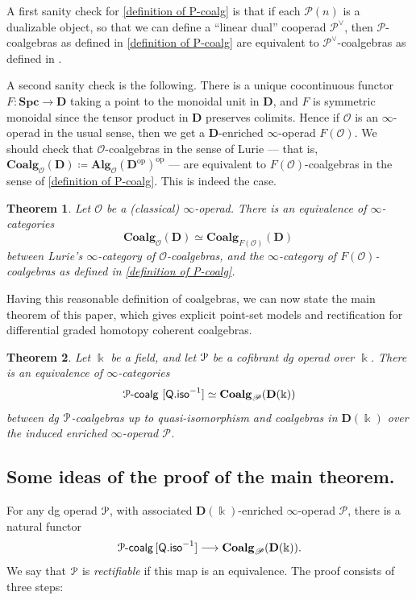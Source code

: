 \documentclass{proc-l}
\renewcommand{\mathcal}{\EuScript}
\newtheorem{theoremintro}{Theorem}
\newcommand{\onepcoalg}{\mathcal{P}\text{-}\mathsf{coalg}}
\theoremstyle{plain}
\theoremstyle{definition}
\theoremstyle{remark}
\newcommand{\kk}{\Bbbk}
\begin{document}
A first sanity check for \cref{definition of P-coalg} is that if each $\mathscr P(n)$ is a dualizable object, so that we can define a ``linear dual'' cooperad $\mathscr P^\vee$, then $\mathscr P$-coalgebras as defined in \cref{definition of P-coalg} are equivalent to $\mathscr P^\vee$-coalgebras as defined in \cite[Appendix A]{heuts2024}.

A second sanity check is the following. There is a unique cocontinuous functor $F : \mathbf{Spc}\longrightarrow \mathbf D$ taking a point to the monoidal unit in $\mathbf D$, and $F$ is symmetric monoidal since the tensor product in $\mathbf D$ preserves colimits. Hence if $\mathscr O$ is an $\infty$-operad in the usual sense, then we get a $\mathbf D$-enriched $\infty$-operad $F(\mathscr O)$. We should check that $\mathscr O$-coalgebras in the sense of Lurie --- that is, $\mathbf{Coalg}_{\mathscr{O}}(\mathbf{D}) \coloneqq \mathbf{Alg}_{\mathscr{O}}(\mathbf{D}^{\mathrm{op}})^{\mathrm{op}}$ --- are equivalent to $F(\mathscr O)$-coalgebras in the sense of \cref{definition of P-coalg}. This is indeed the case.

\begin{theoremintro}%
\label{Theorem:B}Let $\mathscr{O}$ be a (classical) $\infty$-operad. There is an equivalence of $\infty$-categories
\[
\mathbf{Coalg}_{\mathscr{O}}(\mathbf{D}) \simeq \mathbf{Coalg}_{F(\mathscr{O})}(\mathbf{D})~
\]
between Lurie's $\infty$-category of $\mathscr{O}$-coalgebras, and the $\infty$-category of $F(\mathscr{O})$-coalgebras as defined in \cref{definition of P-coalg}.
\end{theoremintro}

Having this reasonable definition of coalgebras, we can now state the main theorem of this paper, which gives explicit point-set models and rectification for differential graded homotopy coherent coalgebras.

\begin{theoremintro}%
\label{Theorem:C}\label{thm: introrectification}
Let $\kk$ be a field, and let $\mathcal{P}$ be a cofibrant dg operad over $\kk$. There is an equivalence of $\infty$-categories
\[
\mathcal{P}\text{-}\mathsf{coalg}~[\mathsf{Q.iso}^{-1}] \simeq \mathbf{Coalg}_{\mathscr{P}}(\mathbf{D}(\kk))
\]
between dg $\mathcal{P}$-coalgebras up to quasi-isomorphism and coalgebras in $\mathbf{D}(\kk)$ over the induced enriched $\infty$-operad $\mathscr{P}$.
\end{theoremintro}

\subsection{Some ideas of the proof of the main theorem.}%
\label{Section:1.4}
For any dg operad $\mathcal P$, with associated $\mathbf D(\kk)$-enriched $\infty$-operad $\mathscr P$, there is a natural functor
\[
\onepcoalg\,[\mathsf{Q.iso}^{-1}] \longrightarrow \mathbf{Coalg}_{\mathscr{P}}(\mathbf{D}(\kk)).
\]
We say that $\mathcal P$ is \emph{rectifiable}  if this map is an equivalence. The proof consists of three steps:
\end{document}

